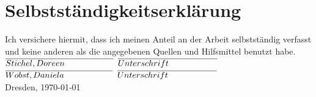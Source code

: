 \section{Selbstständigkeitserklärung}
\label{sec:Selbstständigkeitserklärung}

Ich versichere hiermit, dass ich meinen Anteil an der Arbeit selbstständig verfasst und keine anderen als die angegebenen Quellen und Hilfsmittel benutzt habe.\\[2cm]

$\overline{Stichel, Doreen\hphantom{spaces}\hphantom{spaces}}$ \hfill $\overline{Unterschrift\hphantom{spaces}\hphantom{spaces}}$\\[1cm]

$\overline{Wobst, Daniela\hphantom{spaces}\hphantom{spaces}}$ \hfill $\overline{Unterschrift\hphantom{spaces}\hphantom{spaces}}$\\[2cm]

Dresden, \today